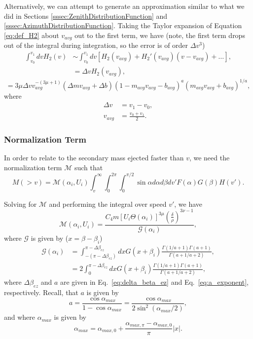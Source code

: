 \documentclass{hitec}
\numberwithin{equation}{section}
\begin{document}
Alternatively, we can attempt to generate an approximation similar to what we did in Sections \ref{sssec:ZenithDistributionFunction} and \ref{sssec:AzimuthDistributionFunction}. Taking the Taylor expansion of Equation \eqref{eq:def_H2} about $v_{avg}$ out to the first term, we have (note, the first term drops out of the integral during integration, so the error is of order $\Delta v^3$)
\begin{align}
\int_{v_0}^{v_1}dv H_2(v) &\sim \int_{v_0}^{v_1}dv[H_2(v_{avg}) + H_2'(v_{avg})(v-v_{avg})+\dots],\\
&= \Delta v H_2(v_{avg}),\nonumber
\end{align}
\begin{equation}
=3\mu\Delta v v_{avg}^{-(3\mu+1)}(\Delta m v_{avg} + \Delta b)(1-m_{avg}v_{avg}-b_{avg})^a(m_{avg}v_{avg} + b_{avg})^{1/a},
\end{equation}
where
\begin{align}
\Delta v &= v_1-v_0,\\
v_{avg} &= \frac{v_0 + v_1}{2}.
\end{align}



\subsubsection{Normalization Term}

In order to relate to the secondary mass ejected faster than $v$, we need the normalization term $\mathcal{M}$ such that
\begin{equation}
M(>v) = \mathcal{M}(\alpha_i, U_i)\int_{v}^{\infty}\int_{0}^{2\pi}\int_{0}^{\pi/2}\sin\alpha d\alpha d\beta dv' F(\alpha)G(\beta)H(v').
\end{equation}

Solving for $\mathcal{M}$ and performing the integral over speed $v'$, we have
\begin{equation}\label{eq:M_norm_term_1}
\mathcal{M}(\alpha_i, U_i) = \frac{C_4 m [U_i\Theta(\alpha_i)]^{3\mu}\left(\frac{\delta}{\rho}\right)^{3\nu-1}}{\mathcal{G}(\alpha_i)},
\end{equation}
where $\mathcal{G}$ is given by ($x = \beta-\beta_i$)
\begin{align}
\mathcal{G}(\alpha_i) &= \int_{-(\pi-\Delta\beta_{ez})}^{\pi-\Delta\beta_{ez}}dx G(x+\beta_i)\frac{\Gamma(1/a+1)\Gamma(a+1)}{\Gamma(a+1/a+2)},\\
&=2\int_{0}^{\pi-\Delta\beta_{ez}}dx G(x+\beta_i)\frac{\Gamma(1/a+1)\Gamma(a+1)}{\Gamma(a+1/a+2)},
\end{align}
where $\Delta\beta_{ez}$ and $a$ are given in Eq.\ \eqref{eq:delta_beta_ez} and Eq.\ \eqref{eq:a_exponent}, respectively. Recall, that $a$ is given by
\begin{equation}
a = \frac{\cos\alpha_{max}}{1-\cos\alpha_{max}} = \frac{\cos\alpha_{max}}{2\sin^2(\alpha_{max}/2)},
\end{equation}
and where $\alpha_{max}$ is given by
\begin{equation}
\alpha_{max} = \alpha_{max,0} + \frac{\alpha_{max,\pi} - \alpha_{max,0}}{\pi}|x|.
\end{equation}
\end{document}
